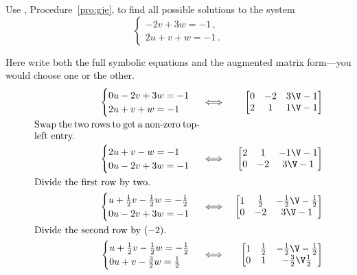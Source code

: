 \begin{example} \label{eg:gjeb}
Use , Procedure~\ref{pro:gje}, to find all possible solutions to the  system
\begin{equation*}
\begin{cases}
-2v+3w=-1\,,\\2u+v+w=-1\,.
\end{cases}
\end{equation*}

\begin{solution} 
Here write both the full symbolic equations and the augmented matrix form---you would choose one or the other.
\begin{eqnarray*}
\begin{cases}
0u-2v+3w=-1\\2u+v+w=-1
\end{cases}
&\iff&%
\begin{bmatrix} 0&-2&3\V-1\\2&1&1\V-1 \end{bmatrix}
\\
\parbox{0.5\linewidth}{Swap the two rows to get a non-zero top-left entry.}
\\
\begin{cases}
2u+v-w=-1\\0u-2v+3w=-1
\end{cases}
&\iff&%
\begin{bmatrix} 2&1&-1\V-1\\0&-2&3\V-1 \end{bmatrix}
\\
\parbox{0.5\linewidth}{Divide the first row by two.}
\\
\begin{cases}
u+\frac12v-\frac12w=-\frac12\\0u-2v+3w=-1
\end{cases}
&\iff&%
\begin{bmatrix} 1&\frac12&-\frac12\V-\frac12\\0&-2&3\V-1 \end{bmatrix}
\\
\parbox{0.5\linewidth}{Divide the second row by~\((-2)\).}
\\
\begin{cases}
u+\frac12v-\frac12w=-\frac12\\0u+v-\frac32w=\frac12
\end{cases}
&\iff&%
\begin{bmatrix} 1&\frac12&-\frac12\V-\frac12\\0&1&-\frac32\V\frac12 \end{bmatrix}

\end{eqnarray*}
\end{solution}
\end{example}
